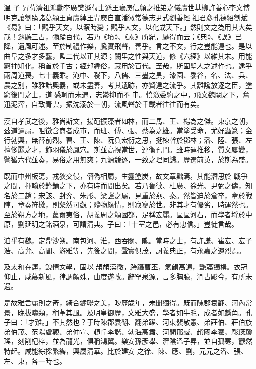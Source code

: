 
\begin{pinyinscope}

 溫
 子
 昇荀濟祖鴻勳李廣樊遜荀士遜王褒庾信顏之推弟之儀虞世基柳許善心李文博明克讓劉臻諸葛潁王貞虞綽王胄庾自直潘徽常德志尹式劉善經
 祖君彥孔德紹劉斌《易》曰：「觀乎天文，以察時變；觀乎人文，以化成天下。」然則文之為用其大矣哉！逖聽三古，彌綸百代，若乃《墳》、《素》所紀，靡得而云；《典》、《謨》已降，遺風可述。至於制禮作樂，騰實飛聲，善乎。言之不文，行之豈能遠也。是以曲阜之多才多藝，監二代以正其源；闕里之性與天道，修《六經》以維其末。用能窮神知化，稱首於千古；經邦緯俗，藏用於百代。至哉，斯固聖人之述作也。逮乎兩周道喪，七十義乖。淹中、稷下，八儒、三墨之異，漆園、黍谷，名、法、兵、農之別，雖雅誥奧義，或未盡善，考其遺跡，亦賢達之流乎。其離讒放逐之臣，塗窮後門之士，道感軻而未遇，志鬱抑而不
 申。憤激委約之中，飛文魏闕之下，奮迅泥滓，自致青雲，振沈溺於一朝，流風聲於千載者往往而有矣。



 漢自孝武之後，雅尚斯文，揚葩振藻者如林，而二馬、王、楊為之傑。東京之朝，茲道逾扇，咀徵含商者成市，而班、傅、張、蔡為之雄。當塗受命，尤好蟲篆；金行勃興，無替前烈。曹、王、陳、阮負宏衍之思，挺棟幹於鄧林；潘、陸、張、左擅侈麗之才，飾羽儀於鳳穴。斯並高視當世，連衡孔門。雖時運推移，質文屢變，譬猶六代並奏，易俗之用無爽；九源競逐，一致之理同歸。歷選前英，於斯為盛。



 既而中州板蕩，戎狄交侵，僭偽相屬，生靈塗炭，故文章黜焉。其能潛思於
 戰爭之間，揮翰於鋒鏑之下，亦有時而間出矣。若乃魯徵、杜廣、徐光、尹弼之儔，知名於二趙；宋該、封弈、朱彤、梁讜之屬，見重於燕、秦。然皆迫於倉卒，牽於戰陣，章奏符檄，則粲然可觀；體物緣情，則寂寥於世。非其才有優劣，時運然也。至於朔方之地，蕞爾夷俗，胡義周之頌國都，足稱宏麗。區區河右，而學者埒於中原，劉延明之銘酒泉，可謂清典。子曰：「十室之邑，必有忠信。」豈徒言哉。



 洎乎有魏，定鼎沙朔。南包河、淮，西吞關、隴。當時之士，有許謙、崔宏、宏子浩、高允、高閭、游雅等，先後之間，聲實俱茂，詞義典正，有永嘉之遺烈焉。



 及太和在運，銳情文學，固以
 頡頏漢徹，跨躡曹丕，氣韻高遠，艷藻獨構。衣冠仰止，咸慕新風，律調頗殊，曲度遂改。辭罕泉源，言多胸臆，潤古彫今，有所未遇。



 是故雅言麗則之奇，綺合繡聯之美，眇歷歲年，未聞獨得。既而陳郡袁翻、河內常景，晚拔疇類，稍革其風。及明皇御歷，文雅大盛，學者如牛毛，成者如麟角。孔子曰：「才難。」不其然也？于時陳郡袁翻、翻弟躍、河東裴敬憲、弟莊伯、莊伯族弟伯茂、范陽盧觀、弟仲宣、頓丘李諧、勃海高肅、河間邢臧、趙國李騫，彫琢瓊瑤，刻削杞梓，並為龍光，俱稱鴻翼。樂安孫彥舉、濟陰溫子昇，並自孤寒，鬱然特起。咸能綜採繁縟，興屬清華。比於建安
 之徐、陳、應、劉，元元之潘、張、左、束，各一時也。




\end{pinyinscope}
